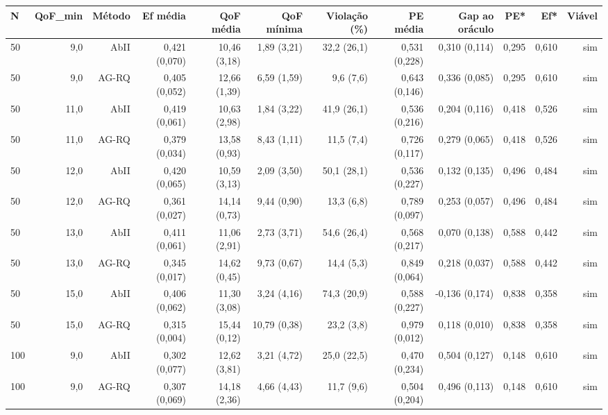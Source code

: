 \begin{tabular}{lrrrrrrrrrrr}
\toprule
N & QoF\_min & Método & Ef média & QoF média & QoF mínima & Violação (\%) & PE média & Gap ao oráculo & PE* & Ef* & Viável \\
\midrule
50 & 9{,}0 & AbII & 0{,}421 (0{,}070) & 10{,}46 (3{,}18) & 1{,}89 (3{,}21) & 32{,}2 (26{,}1) & 0{,}531 (0{,}228) & 0{,}310 (0{,}114) & 0{,}295 & 0{,}610 & sim \\
50 & 9{,}0 & AG-RQ & 0{,}405 (0{,}052) & 12{,}66 (1{,}39) & 6{,}59 (1{,}59) & 9{,}6 (7{,}6) & 0{,}643 (0{,}146) & 0{,}336 (0{,}085) & 0{,}295 & 0{,}610 & sim \\
50 & 11{,}0 & AbII & 0{,}419 (0{,}061) & 10{,}63 (2{,}98) & 1{,}84 (3{,}22) & 41{,}9 (26{,}1) & 0{,}536 (0{,}216) & 0{,}204 (0{,}116) & 0{,}418 & 0{,}526 & sim \\
50 & 11{,}0 & AG-RQ & 0{,}379 (0{,}034) & 13{,}58 (0{,}93) & 8{,}43 (1{,}11) & 11{,}5 (7{,}4) & 0{,}726 (0{,}117) & 0{,}279 (0{,}065) & 0{,}418 & 0{,}526 & sim \\
50 & 12{,}0 & AbII & 0{,}420 (0{,}065) & 10{,}59 (3{,}13) & 2{,}09 (3{,}50) & 50{,}1 (28{,}1) & 0{,}536 (0{,}227) & 0{,}132 (0{,}135) & 0{,}496 & 0{,}484 & sim \\
50 & 12{,}0 & AG-RQ & 0{,}361 (0{,}027) & 14{,}14 (0{,}73) & 9{,}44 (0{,}90) & 13{,}3 (6{,}8) & 0{,}789 (0{,}097) & 0{,}253 (0{,}057) & 0{,}496 & 0{,}484 & sim \\
50 & 13{,}0 & AbII & 0{,}411 (0{,}061) & 11{,}06 (2{,}91) & 2{,}73 (3{,}71) & 54{,}6 (26{,}4) & 0{,}568 (0{,}217) & 0{,}070 (0{,}138) & 0{,}588 & 0{,}442 & sim \\
50 & 13{,}0 & AG-RQ & 0{,}345 (0{,}017) & 14{,}62 (0{,}45) & 9{,}73 (0{,}67) & 14{,}4 (5{,}3) & 0{,}849 (0{,}064) & 0{,}218 (0{,}037) & 0{,}588 & 0{,}442 & sim \\
50 & 15{,}0 & AbII & 0{,}406 (0{,}062) & 11{,}30 (3{,}08) & 3{,}24 (4{,}16) & 74{,}3 (20{,}9) & 0{,}588 (0{,}227) & -0{,}136 (0{,}174) & 0{,}838 & 0{,}358 & sim \\
50 & 15{,}0 & AG-RQ & 0{,}315 (0{,}004) & 15{,}44 (0{,}12) & 10{,}79 (0{,}38) & 23{,}2 (3{,}8) & 0{,}979 (0{,}012) & 0{,}118 (0{,}010) & 0{,}838 & 0{,}358 & sim \\
100 & 9{,}0 & AbII & 0{,}302 (0{,}077) & 12{,}62 (3{,}81) & 3{,}21 (4{,}72) & 25{,}0 (22{,}5) & 0{,}470 (0{,}234) & 0{,}504 (0{,}127) & 0{,}148 & 0{,}610 & sim \\
100 & 9{,}0 & AG-RQ & 0{,}307 (0{,}069) & 14{,}18 (2{,}36) & 4{,}66 (4{,}43) & 11{,}7 (9{,}6) & 0{,}504 (0{,}204) & 0{,}496 (0{,}113) & 0{,}148 & 0{,}610 & sim \\

\end{tabular}
